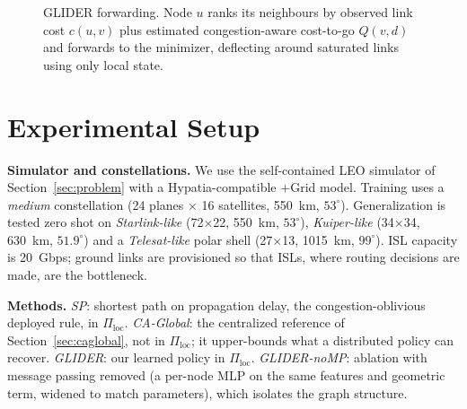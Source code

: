 \documentclass[conference]{IEEEtran}
\begin{document}
\begin{figure}[t]
\centering
{}
\caption{GLIDER forwarding. Node $u$ ranks its neighbours by observed link cost
$c(u,v)$ plus estimated congestion-aware cost-to-go $Q(v,d)$ and forwards to the
minimizer, deflecting around saturated links using only local state.}
\label{fig:overview}
\end{figure}

\section{Experimental Setup}\label{sec:setup}
\textbf{Simulator and constellations.} We use the self-contained LEO simulator of Section~\ref{sec:problem} with a Hypatia-compatible $+$Grid model. Training uses a \emph{medium} constellation (24 planes $\times$ 16 satellites, 550~km, $53^\circ$). Generalization is tested zero shot on \emph{Starlink-like} (72$\times$22, 550~km, $53^\circ$), \emph{Kuiper-like} (34$\times$34, 630~km, $51.9^\circ$) and a \emph{Telesat-like} polar shell (27$\times$13, 1015~km, $99^\circ$). ISL capacity is 20~Gbps; ground links are provisioned so that ISLs, where routing decisions are made, are the bottleneck.

\textbf{Methods.} \emph{SP}: shortest path on propagation delay, the congestion-oblivious deployed rule, in $\Pi_{\mathrm{loc}}$. \emph{CA-Global}: the centralized reference of Section~\ref{sec:caglobal}, not in $\Pi_{\mathrm{loc}}$; it upper-bounds what a distributed policy can recover. \emph{GLIDER}: our learned policy in $\Pi_{\mathrm{loc}}$. \emph{GLIDER-noMP}: ablation with message passing removed (a per-node MLP on the same features and geometric term, widened to match parameters), which isolates the graph structure.
\end{document}

